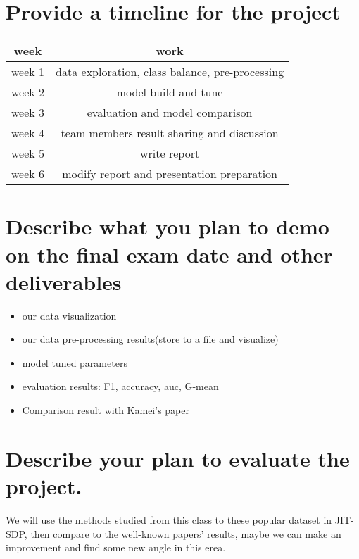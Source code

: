 \documentclass{article}
\begin{document}
\section{Provide a timeline for the project}
\begin{center}
	\begin{tabular}{ c c  }
		week & work \\ 
		\hline
		week 1 & data exploration, class balance, pre-processing \\ 
		week 2 & model build and tune \\  
		week 3 & evaluation and model comparison \\
		week 4 & team members result sharing and discussion   \\
		week 5 & write report  \\ 
		week 6 & modify report and presentation preparation  \\
		\hline
	\end{tabular}
\end{center}

\section{Describe what you plan to demo on the final exam date and other deliverables}
\begin{itemize}
	\item our data visualization 
	\item our data pre-processing results(store to a file and visualize)
	\item model tuned parameters
	\item evaluation results: F1, accuracy, auc, G-mean
	\item Comparison result with Kamei's paper~\cite{kamei2012large}
\end{itemize}

\section{Describe your plan to evaluate the project.}
We will use the methods studied from this class to these popular dataset in JIT-SDP, then compare to the well-known papers' results, maybe we can make an improvement and find some new angle in this erea.















\medskip



\end{document}
